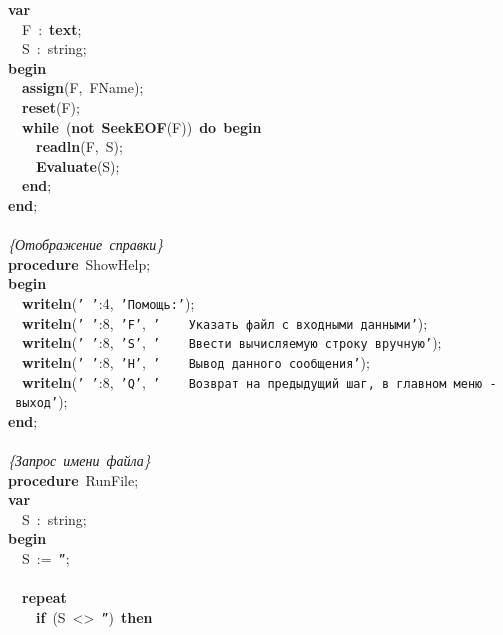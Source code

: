 \mbox{}\textbf{var} \\
\mbox{}\ \ F\ :\ \textbf{text}; \\
\mbox{}\ \ S\ :\ string; \\
\mbox{}\textbf{begin} \\
\mbox{}\ \ \textbf{assign}(F,\ FName); \\
\mbox{}\ \ \textbf{reset}(F); \\
\mbox{}\ \ \textbf{while}\ (\textbf{not}\ \textbf{SeekEOF}(F))\ \textbf{do}\ \textbf{begin} \\
\mbox{}\ \ \ \ \textbf{readln}(F,\ S); \\
\mbox{}\ \ \ \ \textbf{Evaluate}(S); \\
\mbox{}\ \ \textbf{end}; \\
\mbox{}\textbf{end}; \\
\mbox{} \\
\mbox{}\textit{\{Отображение\ справки\}} \\
\mbox{}\textbf{procedure}\ ShowHelp; \\
\mbox{}\textbf{begin} \\
\mbox{}\ \ \textbf{writeln}(\texttt{'\ '}:4,\ \texttt{'Помощь:'}); \\
\mbox{}\ \ \textbf{writeln}(\texttt{'\ '}:8,\ \texttt{'F'},\ \texttt{'\ \ \ \ Указать\ файл\ с\ входными\ данными'}); \\
\mbox{}\ \ \textbf{writeln}(\texttt{'\ '}:8,\ \texttt{'S'},\ \texttt{'\ \ \ \ Ввести\ вычисляемую\ строку\ вручную'}); \\
\mbox{}\ \ \textbf{writeln}(\texttt{'\ '}:8,\ \texttt{'H'},\ \texttt{'\ \ \ \ Вывод\ данного\ сообщения'}); \\
\mbox{}\ \ \textbf{writeln}(\texttt{'\ '}:8,\ \texttt{'Q'},\ \texttt{'\ \ \ \ Возврат\ на\ предыдущий\ шаг,\ в\ главном\ меню\ -\ выход'}); \\
\mbox{}\textbf{end}; \\
\mbox{} \\
\mbox{}\textit{\{Запрос\ имени\ файла\}} \\
\mbox{}\textbf{procedure}\ RunFile; \\
\mbox{}\textbf{var} \\
\mbox{}\ \ S\ :\ string; \\
\mbox{}\textbf{begin} \\
\mbox{}\ \ S\ :=\ \texttt{''}; \\
\mbox{}\  \\
\mbox{}\ \ \textbf{repeat} \\
\mbox{}\ \ \ \ \textbf{if}\ (S\ \textless{}\textgreater{}\ \texttt{''})\ \textbf{then} \\
